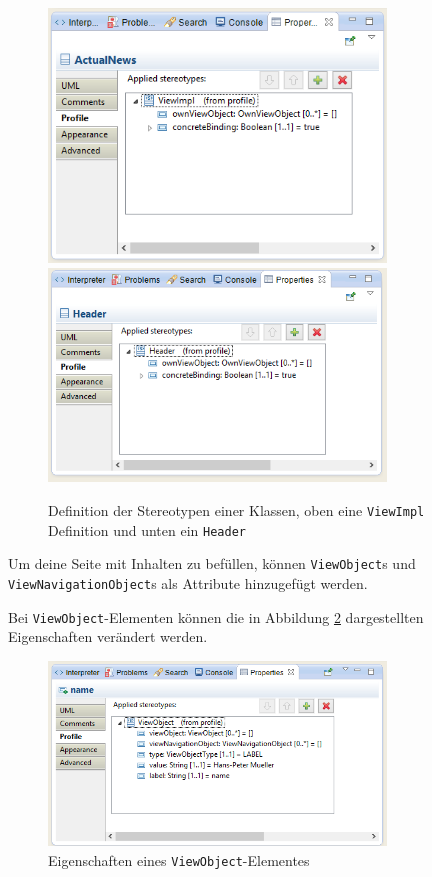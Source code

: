 \begin{figure}[htbp]
\begin{center}
\includegraphics[width=0.8\textwidth]{./img/Prop-ViewImp.png}
\includegraphics[width=0.8\textwidth]{./img/Prop-Header.png}
\caption{Definition der Stereotypen einer Klassen, oben
eine \texttt{ViewImpl} Definition und unten ein
\texttt{Header}}\label{Fig:SideProp}
\end{center}
\end{figure} 

Um deine Seite mit Inhalten zu befüllen, können \texttt{ViewObject}s und 
\texttt{ViewNavigationObject}s als Attribute hinzugefügt werden.

Bei \texttt{ViewObject}-Elementen können die in Abbildung \ref{Fig:ViewProp}
dargestellten Eigenschaften verändert werden.

\begin{figure}[htbp]
\begin{center}
\includegraphics[width=0.8\textwidth]{./img/Prop-ViewObjects.png}
\caption{Eigenschaften eines \texttt{ViewObject}-Elementes }\label{Fig:ViewProp}
\end{center}
\end{figure} 

